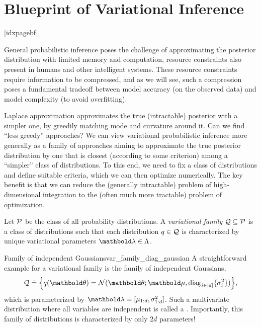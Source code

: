 \section{Blueprint of Variational Inference}\label{sec:vi:blueprint}[idxpagebf]%

General probabilistic inference poses the challenge of approximating the posterior distribution with limited memory and computation, resource constraints also present in humans and other intelligent systems.
These resource constraints require information to be compressed, and as we will see, such a compression poses a fundamental tradeoff between model accuracy (on the observed data) and model complexity (to avoid overfitting).

Laplace approximation approximates the true (intractable) posterior with a simpler one, by greedily matching mode and curvature around it.
Can we find ``less greedy'' approaches?
We can view variational probabilistic inference more generally as a family of approaches aiming to approximate the true posterior distribution by one that is closest (according to some criterion) among a ``simpler'' class of distributions.
To this end, we need to fix a class of distributions and define suitable criteria, which we can then optimize numerically.
The key benefit is that we can reduce the (generally intractable) problem of high-dimensional integration to the (often much more tractable) problem of optimization.

\begin{defn}
  Let $\spP$ be the class of all probability distributions.
  A \emph{variational family} $\mathcal{Q} \subseteq \mathcal{P}$ is a class of distributions such that each distribution $q \in \mathcal{Q}$ is characterized by unique variational parameters $\vlambda \in \Lambda$.
\end{defn}

\begin{marginfigure}
  \caption{An illustration of variational inference in the space of distributions $\spP$.
  The variational distribution $\qs \in \spQ$ is the optimal approximation of the true posterior $p$.}
  \label{fig:variational_families}
\end{marginfigure}

\begin{ex}{Family of independent Gaussians}{var_family_diag_gaussian}
  A straightforward example for a variational family is the family of independent Gaussians, \begin{align}
    \spQ \defeq \braces*{q(\vtheta) = \N[\vtheta]{\vmu}{\diag[i\in[d]]{\sigma_i^2}}},
  \end{align} which is parameterized by ${\vlambda \defeq [\mu_{1:d}, \sigma_{1:d}^2]}$.
  Such a multivariate distribution where all variables are independent is called a .
  Importantly, this family of distributions is characterized by only $2d$ parameters!
\end{ex}


